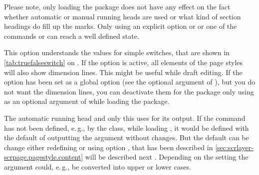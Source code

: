 Please note, only loading the package does not have
any effect on the fact whether automatic or manual running heads are used or
what kind of section headings do fill up the marks. Only using an explicit
option  or  or one of the commands
 or  can reach a well defined state.%
%
%
%
%
%
\fi %

\ifshortversion\IgnoreThistrue{}\fi
\ifIgnoreThis %
\else %

\begin{Declaration}
\end{Declaration}
%
This \KOMAScript{} option understands the values for simple switches, that are
shown in \autoref{tab:truefalseswitch} on . If
the option is active, all elements of the page styles will also show dimension
lines. This might be useful while draft editing. If the option has been set as
a global option (see the optional argument of ), but you
do not want the dimension lines, you can deactivate them for the package only
using  as an optional argument of 
while loading the package.%
%

\begin{Declaration}
\end{Declaration}
%
The automatic running head and only this uses  for its
output. If the command has not been defined, e.\,g., by the class, while
loading , it would be defined with the default of outputting
the argument  without changes. But the default can be change
either redefining  or using option , that
\ifshortversion has been described in
\autoref{sec:scrlayer-scrpage.pagestyle.content}%
\else will be described next%
\fi%
. Depending on the setting the argument could, e.\,g., be converted into upper
or lower cases.
%
%
\fi %

